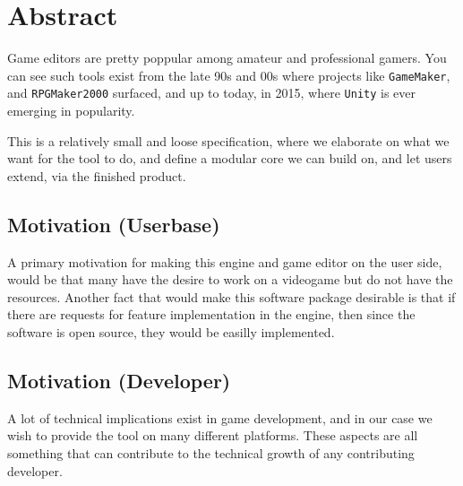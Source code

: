 \section{Abstract}

Game editors are pretty poppular among amateur and professional gamers. You can
see such tools exist from the late 90s and 00s where projects like
\texttt{GameMaker}, and \texttt{RPGMaker2000} surfaced, and up to today, in
2015, where \texttt{Unity} is ever emerging in popularity.

This is a relatively small and loose specification, where we elaborate on what
we want for the tool to do, and define a modular core we can build on, and let
users extend, via the finished product.

\subsection{Motivation (Userbase)}

A primary motivation for making this engine and game editor on the user side,
would be that many have the desire to work on a videogame but do not have the
resources. Another fact that would make this software package desirable is that
if there are requests for feature implementation in the engine, then since the
software is open source, they would be easilly implemented.

\subsection{Motivation (Developer)}

A lot of technical implications exist in game development, and in our case we
wish to provide the tool on many different platforms. These aspects are all
something that can contribute to the technical growth of any contributing
developer.

